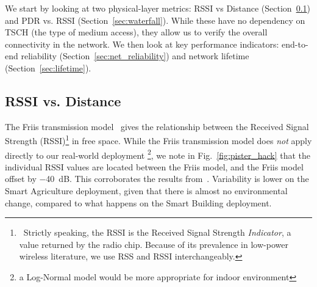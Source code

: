 \documentclass{elsarticle}
\newcommand{\building}            {Smart Building\xspace}
\newcommand{\agri}                {Smart Agriculture\xspace}
\begin{document}

We start by looking at two physical-layer metrics: RSSI vs Distance (Section~\ref{sec:rssi_distance}) and PDR vs. RSSI (Section~\ref{sec:waterfall}).
While these have no dependency on TSCH (the type of medium access), they allow us to verify the overall connectivity in the network.
We then look at key performance indicators: end-to-end reliability (Section~\ref{sec:net_reliability}) and network lifetime (Section~\ref{sec:lifetime}).

\subsection{RSSI vs. Distance}
\label{sec:rssi_distance}

The Friis transmission model~\cite{saunders07antennas} gives the relationship between the Received Signal Strength (RSSI)\footnote{~Strictly speaking, the RSSI is the Received Signal Strength \textit{Indicator}, a value returned by the radio chip. Because of its prevalence in low-power wireless literature, we use RSS and RSSI interchangeably.} in free space.
While the Friis transmission model does \textit{not} apply directly to our real-world deployment \footnote{a Log-Normal model would be more appropriate for indoor environment}, we note in Fig.~\ref{fig:pister_hack} that the individual RSSI values are located between the Friis model, and the Friis model offset by $-$40~dB.
This corroborates the results from~\cite{zats10wireless}.
Variability is lower on the \agri deployment, given that there is almost no environmental change, compared to what happens on the \building deployment.
\end{document}
